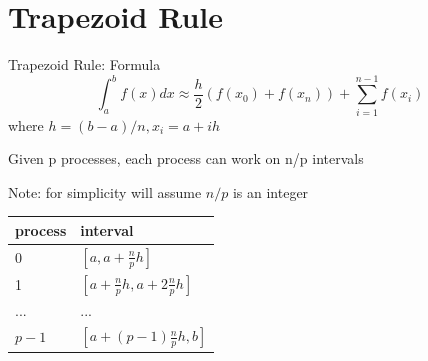 \documentclass[t]{beamer}
\begin{document}
\section{Trapezoid Rule}
\begin{frame}{Trapezoid Rule: Formula}
\[ \int_a^b f(x)dx \approx \frac{h}{2} (f(x_0) + f(x_n)) + \sum_{i=1}^{n-1} f(x_i) \]
where $h = (b-a)/n, x_i = a + ih$

Given p processes, each process can work on n/p intervals

Note: for simplicity will assume $n/p$ is an integer

\begingroup
\renewcommand{\arraystretch}{1.5}
\begin{center}
\begin{tabular}{ l l }
 \hline
 process & interval \\ 
 \hline
 0 & $[a, a + \frac{n}{p}h]$ \\ 
 1 & $[a + \frac{n}{p}h, a + 2\frac{n}{p}h]$ \\ 
 ... & ... \\  
 $p-1$ & $[a + (p - 1)\frac{n}{p}h, b]$ \\
 \hline
\end{tabular}
\end{center}
\endgroup

\end{frame}
\end{document}
